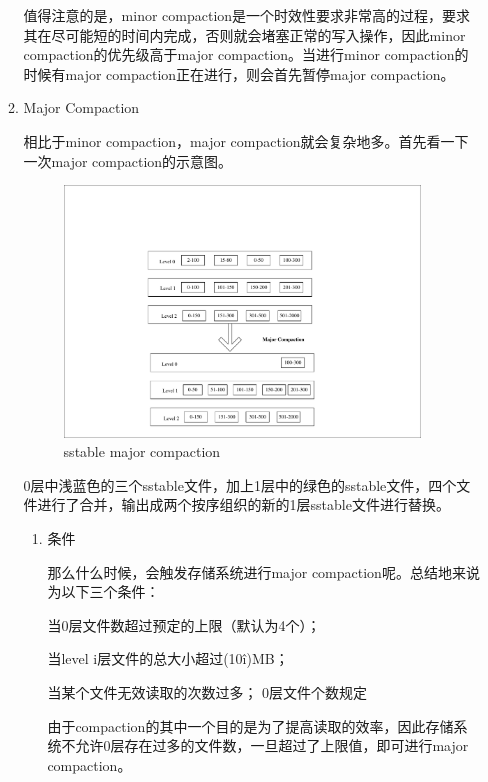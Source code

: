 \begin{enumerate}
\begin{enumerate}
				值得注意的是，minor compaction是一个时效性要求非常高的过程，要求其在尽可能短的时间内完成，否则就会堵塞正常的写入操作，因此minor compaction的优先级高于major compaction。当进行minor compaction的时候有major compaction正在进行，则会首先暂停major compaction。
				
				\item Major Compaction
				
				相比于minor compaction，major compaction就会复杂地多。首先看一下一次major compaction的示意图。
				
				\begin{figure}[H]
					\centering
					\includegraphics[width=0.95\textwidth]{pdf/major_compaction.pdf}
					\caption{sstable major compaction}
					\label{sstable_major_compaction}
				\end{figure}
				
				0层中浅蓝色的三个sstable文件，加上1层中的绿色的sstable文件，四个文件进行了合并，输出成两个按序组织的新的1层sstable文件进行替换。
				

				\begin{enumerate}
					\item 条件
					
					那么什么时候，会触发存储系统进行major compaction呢。总结地来说为以下三个条件：
				
				当0层文件数超过预定的上限（默认为4个）；
				
				当level i层文件的总大小超过(10\^i)MB；
				
				当某个文件无效读取的次数过多；
				0层文件个数规定
				
				
				由于compaction的其中一个目的是为了提高读取的效率，因此存储系统不允许0层存在过多的文件数，一旦超过了上限值，即可进行major compaction。
				

\end{enumerate}
\end{enumerate}
\end{enumerate}
